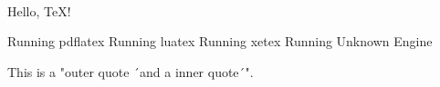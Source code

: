 \documentclass[english,parskip=half,12pt,a4paper]{scrartcl}
\begin{document}


\ttitle{}\\
\tsubtitle{}\\
\tversion{}\\

Hello, \TeX!

\ifPDFTeX
  Running pdflatex
\else\ifLuaTeX
  Running luatex
\else\ifXeTeX
  Running xetex
\else
  Running Unknown Engine
\fi\fi\fi

This is a "outer quote ´and a inner quote´".

\lipsum[2-4]

\lipsum[6-8]
\end{document}
